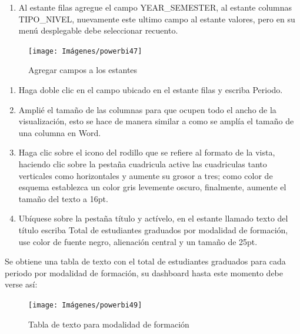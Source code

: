 \documentclass[
]{book}
\providecommand{\tightlist}{%
  \setlength{\itemsep}{0pt}\setlength{\parskip}{0pt}}
\begin{document}
\begin{enumerate}
\def\labelenumi{\arabic{enumi}.}
\setcounter{enumi}{1}
\tightlist
\item
  Al estante filas agregue el campo YEAR\_SEMESTER, al estante columnas TIPO\_NIVEL, nuevamente este ultimo campo al estante valores, pero en su menú desplegable debe seleccionar recuento.
\end{enumerate}

\begin{figure}

{\centering \texttt{[image: Imágenes/powerbi47]} 

}

\caption{Agregar campos a los estantes}\label{fig:paso2matriz-fig}
\end{figure}

\begin{enumerate}
\def\labelenumi{\arabic{enumi}.}
\setcounter{enumi}{2}
\item
  Haga doble clic en el campo ubicado en el estante filas y escriba Periodo.
\item
  Amplié el tamaño de las columnas para que ocupen todo el ancho de la visualización, esto se hace de manera similar a como se amplía el tamaño de una columna en Word.
\item
  Haga clic sobre el icono del rodillo que se refiere al formato de la vista, haciendo clic sobre la pestaña cuadricula active las cuadriculas tanto verticales como horizontales y aumente su grosor a tres; como color de esquema establezca un color gris levemente oscuro, finalmente, aumente el tamaño del texto a 16pt.
\item
  Ubíquese sobre la pestaña título y actívelo, en el estante llamado texto del título escriba Total de estudiantes graduados por modalidad de formación, use color de fuente negro, alienación central y un tamaño de 25pt.
\end{enumerate}

Se obtiene una tabla de texto con el total de estudiantes graduados para cada periodo por modalidad de formación, su dashboard hasta este momento debe verse así:

\begin{figure}

{\centering \texttt{[image: Imágenes/powerbi49]} 

}

\caption{Tabla de texto para modalidad de formación}\label{fig:paso6matriz-fig}
\end{figure}
\end{document}
